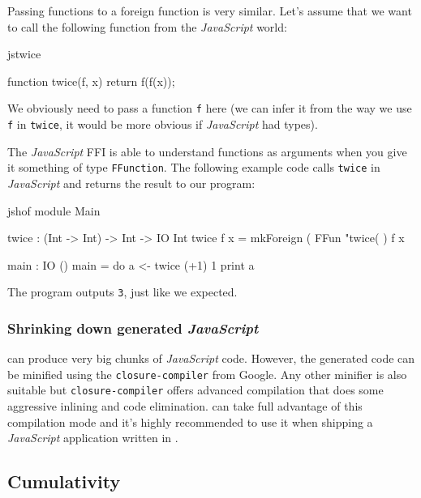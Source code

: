 \noindent
Passing functions to a foreign function is very similar. Let's assume that
we want to call the following function from the \emph{JavaScript} world:

\begin{SaveVerbatim}{jstwice}

function twice(f, x) {
  return f(f(x));
}

\end{SaveVerbatim}

\noindent
We obviously need to pass a function \texttt{f} here (we can infer it from
the way we use \texttt{f} in \texttt{twice}, it would be more obvious if
\emph{JavaScript} had types).

\noindent
The \emph{JavaScript} FFI is able to understand functions as arguments when
you give it something of type \texttt{FFunction}. The following example code
calls \texttt{twice} in \emph{JavaScript} and returns the result to our
\Idris{} program:

\begin{SaveVerbatim}{jshof}
module Main

twice : (Int -> Int) -> Int -> IO Int
twice f x = mkForeign (
  FFun "twice(%
) f x

main : IO ()
main = do
  a <- twice (+1) 1
  print a

\end{SaveVerbatim}

\noindent
The program outputs \texttt{3}, just like we expected.

\subsubsection*{Shrinking down generated \emph{JavaScript}}

\Idris{} can produce very big chunks of \emph{JavaScript} code. However, the
generated code can be minified using the \texttt{closure-compiler} from
Google. Any other minifier is also suitable but \texttt{closure-compiler}
offers advanced compilation that does some aggressive inlining and code
elimination. \Idris{} can take full advantage of this compilation mode and
it's highly recommended to use it when shipping a \emph{JavaScript}
application written in \Idris{}.

\subsection{Cumulativity}


